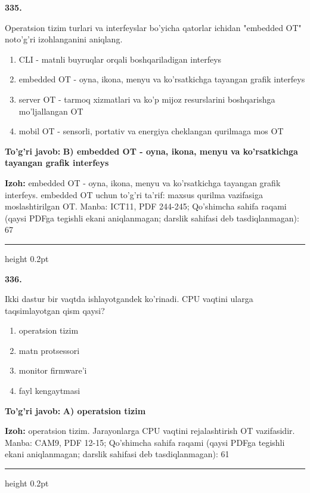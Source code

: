 \documentclass[10pt,a4paper]{article}
\begin{document}
{\bfseries\sffamily\color{ink} 335.}
\par
Operatsion tizim turlari va interfeyslar bo'yicha qatorlar ichidan "embedded OT" noto'g'ri izohlanganini aniqlang.
\begin{enumerate}[label=\Alph*),leftmargin=9mm]
\item CLI - matnli buyruqlar orqali boshqariladigan interfeys
\item embedded OT - oyna, ikona, menyu va ko'rsatkichga tayangan grafik interfeys
\item server OT - tarmoq xizmatlari va ko'p mijoz resurslarini boshqarishga mo'ljallangan OT
\item mobil OT - sensorli, portativ va energiya cheklangan qurilmaga mos OT
\end{enumerate}
\begin{tcolorbox}[enhanced,breakable,colback=teal!4,colframe=teal!60!black,boxrule=0.45pt,arc=1.2mm,left=2.7mm,right=2.7mm,top=1.8mm,bottom=1.8mm,before skip=2mm,after skip=2mm]
{\bfseries\sffamily\color{teal}To'g'ri javob:} \textbf{B) embedded OT - oyna, ikona, menyu va ko'rsatkichga tayangan grafik interfeys}
\par\smallskip
{\bfseries Izoh:} embedded OT - oyna, ikona, menyu va ko'rsatkichga tayangan grafik interfeys. embedded OT uchun to'g'ri ta'rif: maxsus qurilma vazifasiga moslashtirilgan OT. Manba: ICT11, PDF 244-245; Qo'shimcha sahifa raqami (qaysi PDFga tegishli ekani aniqlanmagan; darslik sahifasi deb tasdiqlanmagan): 67
\end{tcolorbox}
\vspace{2mm}\hrule height 0.2pt\vspace{3mm}

{\bfseries\sffamily\color{ink} 336.}
\par
Ikki dastur bir vaqtda ishlayotgandek ko'rinadi. CPU vaqtini ularga taqsimlayotgan qism qaysi?
\begin{enumerate}[label=\Alph*),leftmargin=9mm]
\item operatsion tizim
\item matn protsessori
\item monitor firmware'i
\item fayl kengaytmasi
\end{enumerate}
\begin{tcolorbox}[enhanced,breakable,colback=teal!4,colframe=teal!60!black,boxrule=0.45pt,arc=1.2mm,left=2.7mm,right=2.7mm,top=1.8mm,bottom=1.8mm,before skip=2mm,after skip=2mm]
{\bfseries\sffamily\color{teal}To'g'ri javob:} \textbf{A) operatsion tizim}
\par\smallskip
{\bfseries Izoh:} operatsion tizim. Jarayonlarga CPU vaqtini rejalashtirish OT vazifasidir. Manba: CAM9, PDF 12-15; Qo'shimcha sahifa raqami (qaysi PDFga tegishli ekani aniqlanmagan; darslik sahifasi deb tasdiqlanmagan): 61
\end{tcolorbox}
\vspace{2mm}\hrule height 0.2pt\vspace{3mm}
\end{document}
